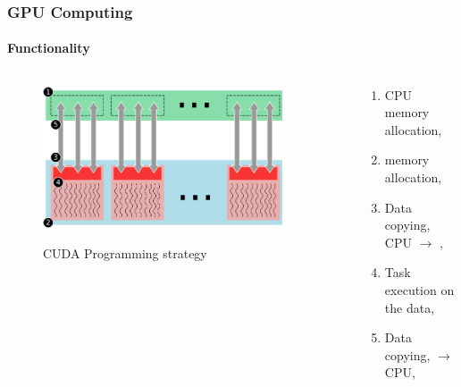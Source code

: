\begin{frame}
    \frametitle{GPU Computing}
    \framesubtitle{Functionality}

    \begin{columns}
        \begin{column}{0.5\textwidth}
            \begin{figure}
                \captionsetup{singlelinecheck=off}
                \centering
                \includegraphics[width=0.9\textwidth]{img/cuda-strategy}
                \label{fig:estrategia}
                \caption{CUDA Programming strategy}
            \end{figure}
        \end{column}
        \begin{column}{0.5\textwidth}
             \begin{enumerate}
                 \item CPU memory allocation,
                 \item {} memory allocation,
                 \item Data copying,  CPU $\rightarrow$ ,
                 \item Task execution on the data,
                 \item Data copying,  $\rightarrow$ CPU,
             \end{enumerate}
        \end{column}
    \end{columns}
\end{frame}

